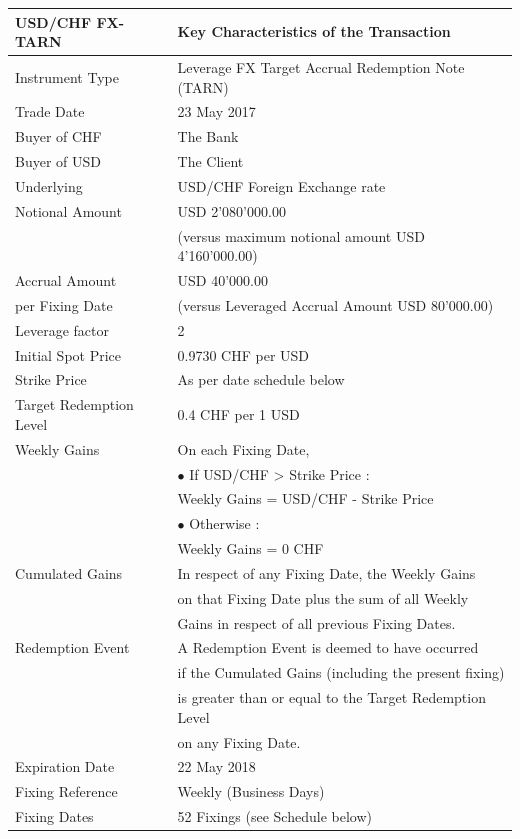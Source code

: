 \begin{longtable}{|l|l|} 
\hline
\textbf{USD/CHF FX-TARN} & \textbf{Key Characteristics of the Transaction} \\
\hline 
\hline
Instrument Type & Leverage FX Target Accrual Redemption Note (TARN) \\
\hline
Trade Date & 23 May 2017\\
\hline
Buyer of CHF & The Bank \\
\hline
Buyer of USD & The Client \\
\hline
Underlying & USD/CHF Foreign Exchange rate\\
\hline
Notional Amount & USD 2'080'000.00 \\
&(versus maximum notional amount USD 4'160'000.00)\\
\hline
Accrual Amount & USD 40'000.00\\
per Fixing Date &(versus Leveraged Accrual Amount USD 80'000.00)\\
\hline
Leverage factor &2\\
\hline
Initial Spot Price & 0.9730 CHF per USD\\
\hline
Strike Price & As per date schedule below\\
\hline
Target Redemption Level & 0.4 CHF per 1 USD\\
\hline
Weekly Gains & On each Fixing Date, \\
& $\bullet$ If USD/CHF > Strike Price :\\
& \qquad Weekly Gains = USD/CHF - Strike Price\\ 
& $\bullet$ Otherwise :\\
& \qquad Weekly Gains = 0 CHF\\
\hline
Cumulated Gains & In respect of any Fixing Date, the Weekly Gains \\
& on that Fixing Date plus the sum of all Weekly \\
& Gains in respect of all previous Fixing Dates.\\
\hline
Redemption Event & A Redemption Event is deemed to have occurred \\
& if the Cumulated Gains (including the present fixing)\\ 
& is greater than or equal to the Target Redemption Level\\ 
& on any Fixing Date.\\
\hline
Expiration Date & 22 May 2018 \\
\hline
Fixing Reference & Weekly (Business Days)\\
\hline
Fixing Dates & 52 Fixings (see Schedule below)\\

\end{longtable}
